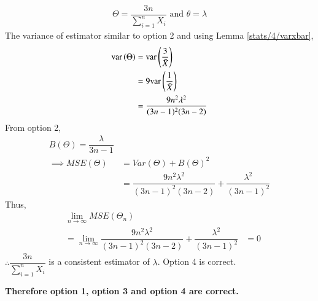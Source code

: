 \begin{enumerate}
         \begin{align}
             \Theta = \dfrac{3n}{\sum_{i=1}^{n} X_i } \text{  and  }
             \theta = \lambda
         \end{align}
         The variance of estimator similar to option 2 and using Lemma \ref{stats/4/varxbar},
         \begin{align}
             \text{var}\left( \Theta \right) &= \text{var}\left( \dfrac{3}{\Bar{X}} \right)\\
             &= 9 \text{var}\left( \dfrac{1}{\Bar{X}} \right)\\
             &=  \dfrac{9n^2\lambda^2}{(3n-1)^2(3n-2)}
         \end{align}
        From option 2,
        \begin{align}
            B(\Theta) = \dfrac{\lambda}{3n-1} \\
\implies             MSE(\Theta) &= Var(\Theta) + B(\Theta)^2 \\
            &= \dfrac{9n^2\lambda^2}{(3n-1)^2(3n-2)} + \dfrac{\lambda^2}{(3n-1)^2}
        \end{align}
        Thus, 
        \begin{align}
            & \lim_{n\to\infty} MSE( \Theta_n) \\
             &= \lim_{n\to\infty} \dfrac{9n^2\lambda^2}{(3n-1)^2(3n-2)} + \dfrac{\lambda^2}{(3n-1)^2} 
             &=0
        \end{align}
        $\therefore\dfrac{3n}{\sum_{i=1}^{n} X_i} $ is a consistent estimator of $ \lambda$. 
        Option 4 is correct. 
        \end{enumerate}
        \textbf{Therefore option 1, option 3 and option 4 are correct.}